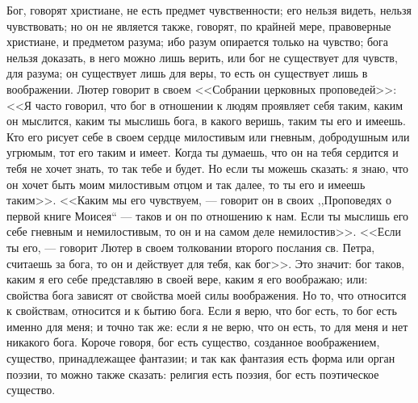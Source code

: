 \documentclass[12pt]{article}
\begin{document}
Бог, говорят христиане, не есть предмет чувственности; его нельзя видеть, нельзя чувствовать; но он не является также, говорят, по крайней мере, правоверные христиане, и предметом разума; ибо разум опирается только на чувство; бога нельзя доказать, в него можно лишь верить, или бог не существует для чувств, для разума; он существует лишь для веры, то есть он существует лишь в воображении. Лютер говорит в своем <<Собрании церковных проповедей>>: <<Я часто говорил, что бог в отношении к людям проявляет себя таким, каким он мыслится, каким ты мыслишь бога, в какого веришь, таким ты его и имеешь. Кто его рисует себе в своем сердце милостивым или гневным, добродушным или угрюмым, тот его таким и имеет. Когда ты думаешь, что он на тебя сердится и тебя не хочет знать, то так тебе и будет. Но если ты можешь сказать: я знаю, что он хочет быть моим милостивым отцом и так далее, то ты его и имеешь таким>>. <<Каким мы его чувствуем, --- говорит он в своих ,,Проповедях о первой книге Моисея`` --- таков и он по отношению к нам. Если ты мыслишь его себе гневным и немилостивым, то он и на самом деле немилостив>>. <<Если ты его, --- говорит Лютер в своем толковании второго послания св. Петра, считаешь за бога, то он и действует для тебя, как бог>>. Это значит: бог таков, каким я его себе представляю в своей вере, каким я его воображаю; или: свойства бога зависят от свойства моей силы воображения. Но то, что относится к свойствам, относится и к бытию бога. Если я верю, что бог есть, то бог есть именно для меня; и точно так же: если я не верю, что он есть, то для меня и нет никакого бога. Короче говоря, бог есть существо, созданное воображением, существо, принадлежащее фантазии; и так как фантазия есть форма или орган поэзии, то можно также сказать: религия есть поэзия, бог есть поэтическое существо. 
\end{document}
